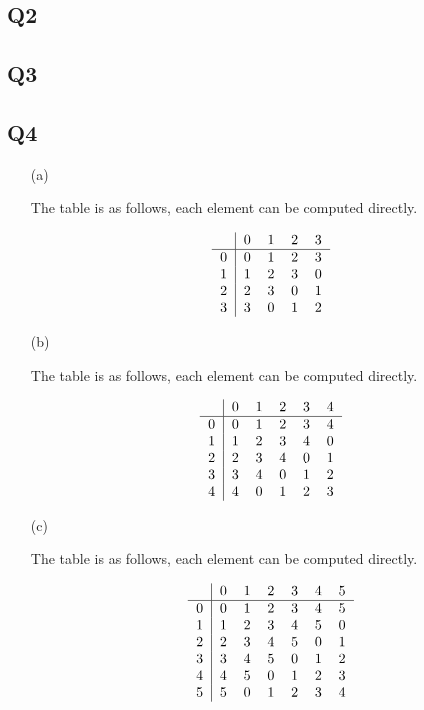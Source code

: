 \documentclass[12pt]{article}
\numberwithin{theorem}{section}
\numberwithin{equation}{section}
\numberwithin{remark}{section}
\numberwithin{definition}{section}
\numberwithin{theorem}{section}
\numberwithin{lemma}{section}
\numberwithin{example}{section}
\begin{document}
\subsection{Q2}

\subsection{Q3}

\subsection{Q4}

\begin{itemize}
	\item[(a)]{The table is as follows, each element can be computed directly.

\begin{align*}
	\begin{tabular}{c|cccc}
		& 0 & 1 & 2 & 3 \\
		\hline
		0 & 0 & 1 & 2 & 3 \\
		1 & 1 & 2 & 3 & 0 \\
		2 & 2 & 3 & 0 & 1 \\
		3 & 3 & 0 & 1 & 2 \\
	\end{tabular}
\end{align*}
	
}
	\item[(b)]{The table is as follows, each element can be computed directly.

\begin{align*}
	\begin{tabular}{c|ccccc}
		& 0 & 1 & 2 & 3 & 4\\
		\hline
		0 & 0 & 1 & 2 & 3 & 4\\
		1 & 1 & 2 & 3 & 4 & 0\\
		2 & 2 & 3 & 4 & 0 & 1\\
		3 & 3 & 4 & 0 & 1 & 2\\
		4 & 4 & 0 & 1 & 2 & 3\\
	\end{tabular}	
\end{align*}
	
}
	\item[(c)]{The table is as follows, each element can be computed directly.

\begin{align*}
	\begin{tabular}{c|cccccc}
		& 0 & 1 & 2 & 3 & 4 & 5\\
		\hline
		0 & 0 & 1 & 2 & 3 & 4 & 5\\
		1 & 1 & 2 & 3 & 4 & 5 & 0\\
		2 & 2 & 3 & 4 & 5 & 0 & 1\\
		3 & 3 & 4 & 5 & 0 & 1 & 2\\
		4 & 4 & 5 & 0 & 1 & 2 & 3\\
		5 & 5 & 0 & 1 & 2 & 3 & 4\\
	\end{tabular}
\end{align*}

	
}
\end{itemize}
\end{document}
